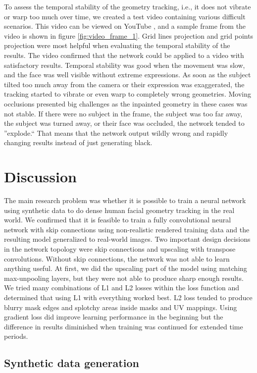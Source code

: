 To assess the temporal stability of the geometry tracking, i.e., it does not vibrate or warp too much over time, we created a test video containing various difficult scenarios. This video can be viewed on YouTube \cite{uvnet}, and a sample frame from the video is shown in figure \ref{fig:video_frame_1}. Grid lines projection and grid points projection were most helpful when evaluating the temporal stability of the results. The video confirmed that the network could be applied to a video with satisfactory results. Temporal stability was good when the movement was slow, and the face was well visible without extreme expressions. As soon as the subject tilted too much away from the camera or their expression was exaggerated, the tracking started to vibrate or even warp to completely wrong geometries. Moving occlusions presented big challenges as the inpainted geometry in these cases was not stable. If there were no subject in the frame, the subject was too far away, the subject was turned away, or their face was occluded, the network tended to ''explode.`` That means that the network output wildly wrong and rapidly changing results instead of just generating black.

\section{Discussion}

The main research problem was whether it is possible to train a neural network using synthetic data to do dense human facial geometry tracking in the real world. We confirmed that it is feasible to train a fully convolutional neural network with skip connections using non-realistic rendered training data and the resulting model generalized to real-world images. Two important design decisions in the network topology were skip connections and upscaling with transpose convolutions. Without skip connections, the network was not able to learn anything useful. At first, we did the upscaling part of the model using matching max-unpooling layers, but they were not able to produce sharp enough results. We tried many combinations of L1 and L2 losses within the loss function and determined that using L1 with everything worked best. L2 loss tended to produce blurry mask edges and splotchy areas inside masks and UV mappings. Using gradient loss did improve learning performance in the beginning but the difference in results diminished when training was continued for extended time periods.

\subsection{Synthetic data generation}

